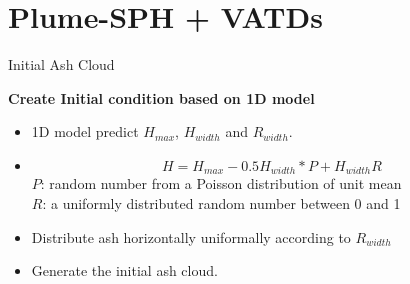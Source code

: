 \documentclass{beamer}
\begin{document}
\section{Plume-SPH + VATDs}
\begin{frame}{Initial Ash Cloud}
\begin{minipage}{.67\textwidth}
\textbf{Create Initial condition based on 1D model}
\begin{itemize}
\item 1D model predict $H_{max}$, $H_{width}$ and $R_{width}$.
\item\begin{equation}
H=H_{max} - 0.5 H_{width}*P+H_{width}R
\label{eq:Poisson-plume-shape}
\end{equation}
$P$: random number from a Poisson
distribution of unit mean \\ 
$R$: a uniformly distributed random number between 0 and 1
\item Distribute ash horizontally uniformally according to $R_{width}$
\item Generate the initial ash cloud.
\end{itemize}
\end{minipage}
\noindent
\begin{minipage}{.32\textwidth}

\end{minipage}
\end{frame}
\end{document}
